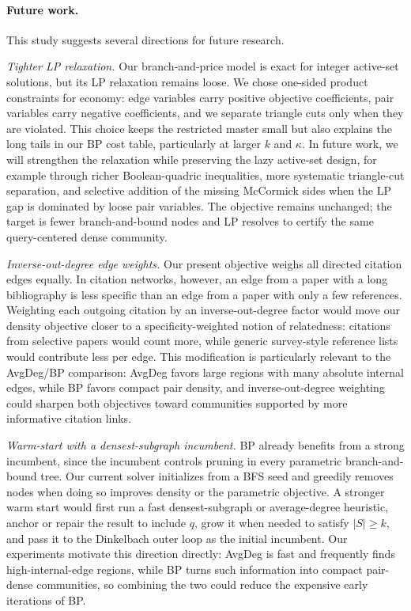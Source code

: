 \documentclass[12pt]{article}
\begin{document}
\paragraph{Future work.}
This study suggests several directions for future research.

\emph{Tighter LP relaxation.}  Our branch-and-price model is exact for integer active-set solutions, but its LP relaxation remains loose.  We chose one-sided product constraints for economy: edge variables carry positive objective coefficients, pair variables carry negative coefficients, and we separate triangle cuts only when they are violated.  This choice keeps the restricted master small but also explains the long tails in our BP cost table, particularly at larger $k$ and $\kappa$.  In future work, we will strengthen the relaxation while preserving the lazy active-set design, for example through richer Boolean-quadric inequalities, more systematic triangle-cut separation, and selective addition of the missing McCormick sides when the LP gap is dominated by loose pair variables.  The objective remains unchanged; the target is fewer branch-and-bound nodes and LP resolves to certify the same query-centered dense community.

\emph{Inverse-out-degree edge weights.}  Our present objective weighs all directed citation edges equally.  In citation networks, however, an edge from a paper with a long bibliography is less specific than an edge from a paper with only a few references.  Weighting each outgoing citation by an inverse-out-degree factor would move our density objective closer to a specificity-weighted notion of relatedness: citations from selective papers would count more, while generic survey-style reference lists would contribute less per edge.  This modification is particularly relevant to the AvgDeg/BP comparison: AvgDeg favors large regions with many absolute internal edges, while BP favors compact pair density, and inverse-out-degree weighting could sharpen both objectives toward communities supported by more informative citation links.

\emph{Warm-start with a densest-subgraph incumbent.}  BP already benefits from a strong incumbent, since the incumbent controls pruning in every parametric branch-and-bound tree.  Our current solver initializes from a BFS seed and greedily removes nodes when doing so improves density or the parametric objective.  A stronger warm start would first run a fast densest-subgraph or average-degree heuristic, anchor or repair the result to include $q$, grow it when needed to satisfy $|S|\ge k$, and pass it to the Dinkelbach outer loop as the initial incumbent.  Our experiments motivate this direction directly: AvgDeg is fast and frequently finds high-internal-edge regions, while BP turns such information into compact pair-dense communities, so combining the two could reduce the expensive early iterations of BP.
\end{document}
